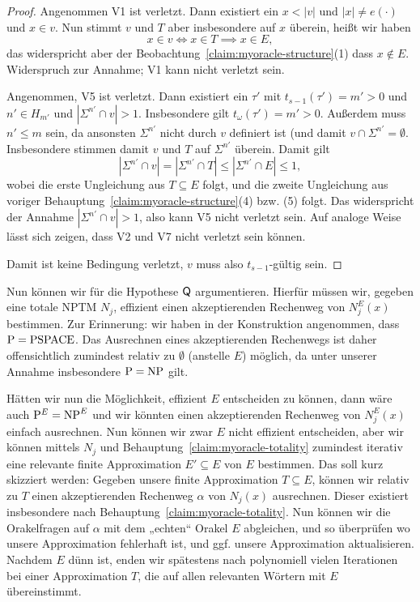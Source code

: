 \begin{proof}
    Angenommen V1 ist verletzt. Dann existiert ein $x<|v|$ und $|x|\neq e(\cdot)$ und $x\in v$.
    Nun stimmt $v$ und $T$ aber insbesondere auf $x$ überein, heißt wir haben
    \[ x\in v \iff x\in T \implies x\in E, \]
    das widerspricht aber der Beobachtung~\ref{claim:myoracle-structure}(1) dass $x\not\in E$.
    Widerspruch zur Annahme; V1 kann nicht verletzt sein.

    Angenommen, V5 ist verletzt. Dann existiert ein $\tau'$ mit $t_{s-1}(\tau')=m'>0$ und $n'\in H_{m'}$ und $|\Sigma^{n'}\cap v|>1$. Insbesondere gilt $t_\omega(\tau')=m'>0$.
    Außerdem muss $n'\leq m$ sein, da ansonsten $\Sigma^{n'}$ nicht durch $v$ definiert ist (und damit $v\cap\Sigma^{n'}=\emptyset$.
    Insbesondere stimmen damit $v$ und $T$ auf $\Sigma^{n'}$ überein.
    Damit gilt
    \[ |\Sigma^{n'}\cap v|=|\Sigma^{n'}\cap T|\leq |\Sigma^{n'}\cap E| \leq 1, \]
    wobei die erste Ungleichung aus $T\subseteq E$ folgt, und die zweite Ungleichung aus voriger Behauptung~\ref{claim:myoracle-structure}(4) bzw. (5) folgt.
    Das widerspricht der Annahme $|\Sigma^{n'}\cap v|>1$, also kann V5 nicht verletzt sein. Auf analoge Weise lässt sich zeigen, dass V2 und V7 nicht verletzt sein können.

    Damit ist keine Bedingung verletzt, $v$ muss also $t_{s-1}$-gültig sein.
\end{proof}

Nun können wir für die Hypothese $\mathsf{Q}$ argumentieren.
Hierfür müssen wir, gegeben eine totale NPTM $N_j$, effizient einen akzeptierenden Rechenweg von $N_j^E(x)$ bestimmen.
Zur Erinnerung: wir haben in der Konstruktion angenommen, dass $\mathrm{P}=\mathrm{PSPACE}$.
Das Ausrechnen eines akzeptierenden Rechenwegs ist daher offensichtlich zumindest relativ zu $\emptyset$ (anstelle $E$) möglich, da unter unserer Annahme insbesondere $\mathrm{P}=\mathrm{NP}$ gilt.

Hätten wir nun die Möglichkeit, effizient $E$ entscheiden zu können, dann wäre auch $\mathrm{P}^{E}=\mathrm{NP}^{E}$ und wir könnten einen akzeptierenden Rechenweg von $N_j^E(x)$ einfach ausrechnen.
Nun können wir zwar $E$ nicht effizient entscheiden, aber wir können mittels $N_j$ und Behauptung~\ref{claim:myoracle-totality} zumindest iterativ eine relevante finite Approximation $E'\subseteq E$ von $E$ bestimmen.
Das soll kurz skizziert werden: Gegeben unsere finite Approximation $T\subseteq E$, können wir relativ zu $T$ einen akzeptierenden Rechenweg $\alpha$ von $N_j(x)$ ausrechnen. Dieser existiert insbesondere nach Behauptung~\ref{claim:myoracle-totality}. Nun können wir die Orakelfragen auf $\alpha$ mit dem „echten“ Orakel $E$ abgleichen, und so überprüfen wo unsere Approximation fehlerhaft ist, und ggf. unsere Approximation aktualisieren. Nachdem $E$ dünn ist,  enden wir spätestens nach polynomiell vielen Iterationen bei einer Approximation $T$, die auf allen relevanten Wörtern mit $E$ übereinstimmt.


